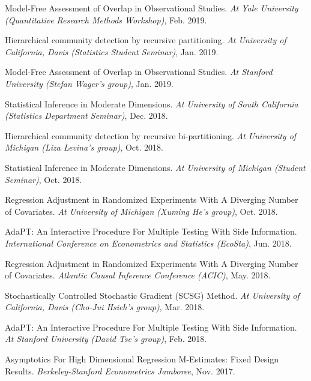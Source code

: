 \documentclass{article}
\begin{document}
\vspace{2mm}
Model-Free Assessment of Overlap in Observational Studies. \emph{At Yale University (Quantitative Research Methods Workshop)}, Feb. 2019.

\vspace{2mm}
Hierarchical community detection by recursive partitioning. \emph{At University of California, Davis (Statistics Student Seminar)}, Jan. 2019.

\vspace{2mm}
Model-Free Assessment of Overlap in Observational Studies. \emph{At Stanford University (Stefan Wager's group)}, Jan. 2019.

\vspace{2mm}
Statistical Inference in Moderate Dimensions. \emph{At University of South California (Statistics Department Seminar)}, Dec. 2018.

\vspace{2mm}
Hierarchical community detection by recursive bi-partitioning. \emph{At University of Michigan (Liza Levina's group)}, Oct. 2018.

\vspace{2mm}
Statistical Inference in Moderate Dimensions. \emph{At University of Michigan (Student Seminar)}, Oct. 2018.

\vspace{2mm}
Regression Adjustment in Randomized Experiments With A Diverging Number of Covariates. \emph{At University of Michigan (Xuming He's group)}, Oct. 2018.

\vspace{2mm}
AdaPT: An Interactive Procedure For Multiple Testing With Side Information. \emph{International Conference on Econometrics and Statistics (EcoSta)}, Jun. 2018.

\vspace{2mm}
Regression Adjustment in Randomized Experiments With A Diverging Number of Covariates. \emph{Atlantic Causal Inference Conference (ACIC)}, May. 2018.

\vspace{2mm}
Stochastically Controlled Stochastic Gradient (SCSG) Method. \emph{At University of California, Davis (Cho-Jui Hsieh's group)}, Mar. 2018.

\vspace{2mm}
AdaPT: An Interactive Procedure For Multiple Testing With Side Information. \emph{At Stanford University (David Tse's group)}, Feb. 2018.

\vspace{2mm}
Asymptotics For High Dimensional Regression M-Estimates: Fixed Design Results. \emph{Berkeley-Stanford Econometrics Jamboree}, Nov. 2017. 
\end{document}
